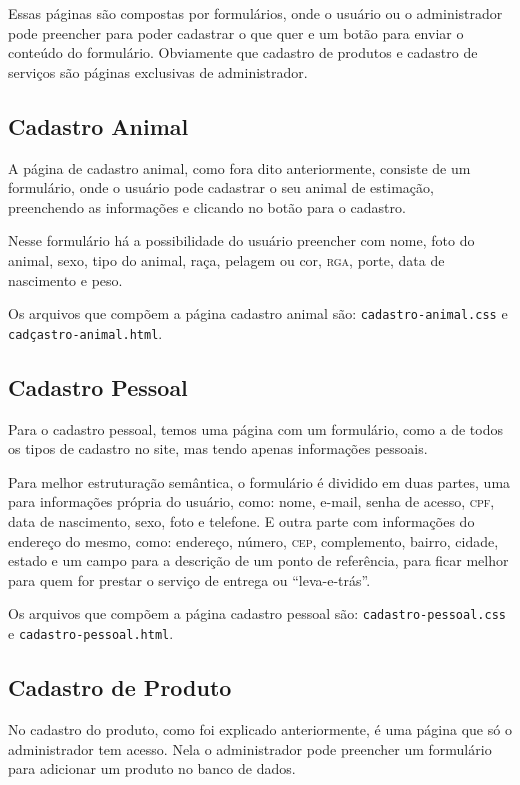 Essas páginas são compostas por formulários, onde o usuário ou o administrador pode preencher
para poder cadastrar o que quer e um botão para enviar o conteúdo do formulário. Obviamente
que cadastro de produtos e cadastro de serviços são páginas exclusivas de administrador.

\subsection{Cadastro Animal}
A página de cadastro animal, como fora dito anteriormente, consiste de um formulário,
onde o usuário pode cadastrar o seu animal de estimação, preenchendo as informações e
clicando no botão para o cadastro.

Nesse formulário há a possibilidade do usuário preencher com nome, foto do animal, sexo,
tipo do animal, raça, pelagem ou cor, \textsc{rga}, porte, data de nascimento e peso.

Os arquivos que compõem a página cadastro animal são: \texttt{cadastro-animal.css} e
\texttt{cadçastro-animal.html}.

\subsection{Cadastro Pessoal}
Para o cadastro pessoal, temos uma página com um formulário, como a de todos os tipos
de cadastro no site, mas tendo apenas informações pessoais.

Para melhor estruturação semântica, o formulário é dividido em duas partes, uma para
informações própria do usuário, como: nome, e-mail, senha de acesso, \textsc{cpf},
data de nascimento, sexo, foto e telefone. E outra parte com informações do endereço
do mesmo, como: endereço, número, \textsc{cep}, complemento, bairro, cidade, estado
e um campo para a descrição de um ponto de referência, para ficar melhor para quem for
prestar o serviço de entrega ou “leva-e-trás”.

Os arquivos que compõem a página cadastro pessoal são: \texttt{cadastro-pessoal.css} e
\texttt{cadastro-pessoal.html}.

\subsection{Cadastro de Produto}
No cadastro do produto, como foi explicado anteriormente, é uma página que só o administrador
tem acesso. Nela o administrador pode preencher um formulário para adicionar um produto no
banco de dados.

